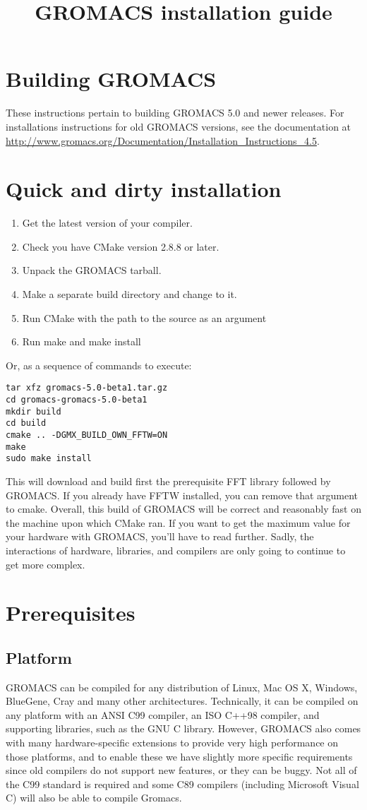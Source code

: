 \documentclass{article}[12pt,a4paper,twoside]
\title{GROMACS installation guide}
\newcommand{\gromacs}{GROMACS}
\newcommand{\cmake}{CMake}
\newcommand{\cmakeversion}{2.8.8}
\newcommand{\gromacsversion}{5.0}
\begin{document}
\section{Building GROMACS}

These instructions pertain to building \gromacs{} \gromacsversion{}
and newer releases. For installations instructions for old \gromacs{}
versions, see the documentation at
\url{http://www.gromacs.org/Documentation/Installation_Instructions_4.5}.

\section{Quick and dirty installation}

\begin{enumerate}
\item Get the latest version of your compiler.
\item Check you have \cmake{} version \cmakeversion{} or later.
\item Unpack the \gromacs{} tarball.
\item Make a separate build directory and change to it. 
\item Run \cmake{} with the path to the source as an argument
\item Run make and make install
\end{enumerate}
Or, as a sequence of commands to execute:
\begin{verbatim}
tar xfz gromacs-5.0-beta1.tar.gz
cd gromacs-gromacs-5.0-beta1
mkdir build
cd build
cmake .. -DGMX_BUILD_OWN_FFTW=ON
make
sudo make install
\end{verbatim}
This will download and build first the prerequisite FFT library followed by \gromacs{}. If you already have
FFTW installed, you can remove that argument to cmake. Overall, this build 
of \gromacs{} will be correct and reasonably fast on the
machine upon which \cmake{} ran. If you want to get the maximum value
for your hardware with \gromacs{}, you'll have to read further.
Sadly, the interactions of hardware, libraries, and compilers
are only going to continue to get more complex. 

\section{Prerequisites}
\subsection{Platform}
\gromacs{} can be compiled for any distribution of Linux, Mac OS X,
Windows, BlueGene, Cray and many other
architectures. Technically, it can be compiled on any platform with
an ANSI C99 compiler, an ISO C++98 compiler, and supporting libraries,
such as the GNU C library. However, \gromacs{} also comes with many
hardware-specific extensions to provide very high performance on those
platforms, and to enable these we have slightly more specific
requirements since old compilers do not support new features, or they
can be buggy. Not all of the C99 standard is required and some C89
compilers (including Microsoft Visual C) will also be able to compile
Gromacs.
\end{document}
